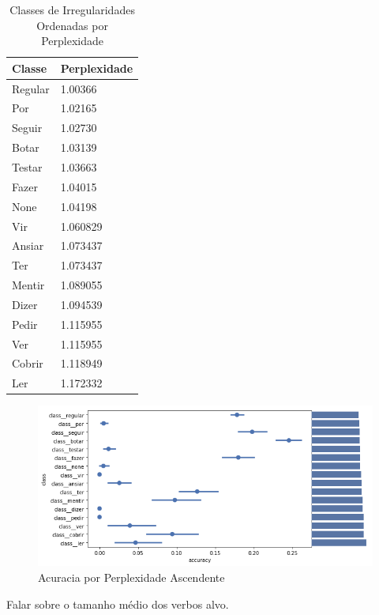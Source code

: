 \begin{table}[H]
\centering
\begin{tabular}{ll}
Classe  & Perplexidade \\
\toprule
Regular & 1.00366      \\
\hline
Por     & 1.02165      \\
\hline
Seguir  & 1.02730      \\
\hline
Botar   & 1.03139      \\
\hline
Testar  & 1.03663      \\
\hline
Fazer   & 1.04015      \\
\hline
None    & 1.04198      \\
\hline
Vir     & 1.060829     \\
\hline
Ansiar  & 1.073437     \\
\hline
Ter     & 1.073437     \\
\hline
Mentir  & 1.089055     \\
\hline
Dizer   & 1.094539     \\
\hline
Pedir   & 1.115955     \\
\hline
Ver     & 1.115955     \\
\hline
Cobrir  & 1.118949     \\
\hline
Ler     & 1.172332    \\
\bottomrule
\end{tabular}
\caption{Classes de Irregularidades Ordenadas por Perplexidade}
\label{tab:perplexity}
\end{table}


\begin{figure}[H]
  \centering
  \includegraphics[width=0.8\linewidth]{img/accuracyperplexity.png}
  \caption{Acuracia por Perplexidade Ascendente}
  \label{fig:kfoldprop}
\end{figure}

Falar sobre o tamanho médio dos verbos alvo.

